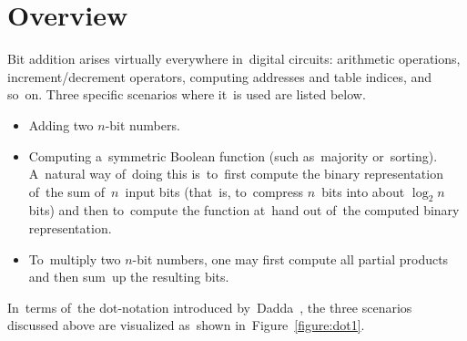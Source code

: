 \documentclass[sigconf, review, anonymous]{acmart}
\DeclareMathOperator{\SUM}{SUM}
\begin{document}
\section{Overview}

Bit addition arises virtually everywhere in~digital circuits:
arithmetic operations,
increment/decrement operators,
computing addresses and table indices, and so~on.
Three specific scenarios where it~is used are listed below.
\begin{itemize}
	\item Adding two $n$-bit numbers.
	\item Computing a~symmetric Boolean function
		(such as~majority or~sorting).
		A~natural way of~doing this is~to~first compute
		the binary representation of~the sum of~$n$~input bits
		(that~is, to~compress $n$~bits into about $\log_2 n$ bits)
		and then to~compute the function at~hand
		out of~the computed binary representation.
	\item To~multiply two $n$-bit numbers, one may first compute
		all partial products and then sum~up the resulting bits.
\end{itemize}
In~terms of~the dot-notation introduced by~Dadda~\cite{dadda}, the three scenarios discussed above are visualized as~shown in~Figure~\ref{figure:dot1}.
\end{document}
